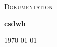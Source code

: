 \begin{titlepage}
	\thispagestyle{firstpage}
	
	\centering
	\vspace*{5cm}
	{\scshape\LARGE Dokumentation\par}
	\vspace{1.5cm}
	{\huge \bfseries \ac{csdwh}\par}
	\vspace{2cm}
	\vfill
	
	{\large \today\par}
\end{titlepage}